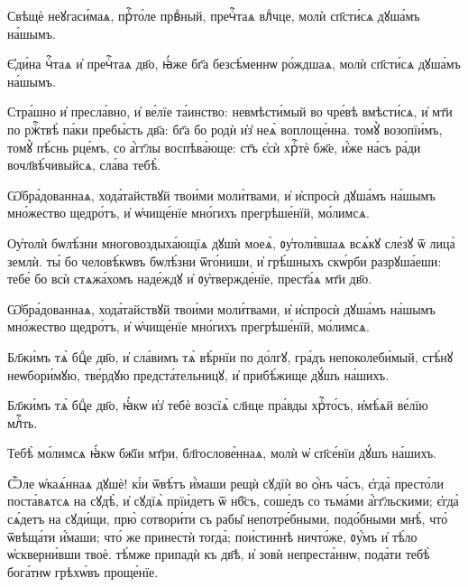 \hKv Свѣщѐ неꙋгаси́маѧ, прⷭ҇то́ле првⷣный, пречⷭ҇таѧ влⷣчце,  молѝ сп҃сти́сѧ дꙋша́мъ на́шымъ.  
%

\hKv Є҆ди́на чⷭ҇таѧ и҆ пречⷭ҇таѧ дв҃о, ꙗ҆́же бг҃а безсѣ́меннѡ  ро́ждшаѧ, молѝ сп҃сти́сѧ дꙋша́мъ на́шымъ.  
%

\hKv Стра́шно и҆ пресла́вно, и҆ ве́лїе та́инство: невмѣсти́мый  во чре́вѣ вмѣсти́сѧ, и҆ мт҃и по ржⷭ҇твѣ̀ па́ки пребы́сть  дв҃а: бг҃а бо родѝ и҆з̾ неѧ̀ воплоще́нна. томꙋ̀  возопїи́мъ, томꙋ̀ пѣ́снь рце́мъ, со а҆́гг҃лы воспѣва́юще:  ст҃ъ є҆сѝ хрⷭ҇тѐ бж҃е, и҆́же на́съ ра́ди  вочл҃вѣ́чивыйсѧ, сла́ва тебѣ̀. 
%

\hKv Ѡ҆бра́дованнаѧ, хода́тайствꙋй твои́ми моли́твами, и҆  и҆спросѝ дꙋша́мъ на́шымъ мно́жество щедро́тъ, и҆ ѡ҆чище́нїе  мно́гихъ прегрѣше́нїй, мо́лимсѧ.  
%

\hKv Оу҆толѝ бѡлѣ́зни многовоздыха́ющїѧ дꙋшѝ моеѧ̀,  ᲂу҆толи́вшаѧ всѧ́кꙋ сле́зꙋ ѿ лица̀ землѝ. ты́ бо  человѣ́кѡвъ бѡлѣ́зни ѿго́ниши, и҆ грѣ́шныхъ скѡ́рби  разрꙋша́еши:  тебе́ бо всѝ  стѧжа́хомъ наде́ждꙋ и҆ ᲂу҆твержде́нїе, прест҃а́ѧ мт҃и дв҃о. 
%

\hKv Ѡ҆бра́дованнаѧ, хода́тайствꙋй твои́ми моли́твами, и҆  и҆спросѝ дꙋша́мъ на́шымъ мно́жество щедро́тъ, и҆ ѡ҆чище́нїе  мно́гихъ прегрѣше́нїй, мо́лимсѧ. 
%

\hKv Бл҃жи́мъ тѧ̀ бцⷣе дв҃о, и҆ сла́вимъ тѧ̀ вѣ́рнїи по до́лгꙋ,  гра́дъ непоколеби́мый, стѣ́нꙋ неѡбори́мꙋю, тве́рдꙋю  предста́тельницꙋ, и҆ прибѣ́жище дꙋ́шъ на́шихъ. 
%

\hKv Бл҃жи́мъ тѧ̀ бцⷣе дв҃о, ꙗ҆́кѡ и҆з̾ тебѐ возсїѧ̀ сл҃нце  пра́вды хрⷭ҇то́съ, и҆мѣ́ѧй ве́лїю млⷭ҇ть. 
%

\hKv Тебѣ̀ мо́лимсѧ ꙗ҆́кѡ бж҃їи мт҃ри, бл҃гослове́ннаѧ, молѝ  ѡ҆ сп҃се́нїи дꙋ́шъ на́шихъ.  
%

\hKv Ѽле ѡ҆каѧ́ннаѧ дꙋшѐ! кі́и ѿвѣ́тъ и҆́маши рещѝ сꙋдїѝ  во ѻ҆́нъ ча́съ, є҆гда̀ престо́ли поста́вѧтсѧ на сꙋдѣ̀, и҆  сꙋдїѧ̀ прїи́детъ ѿ нб҃съ, соше́дъ со тьма́ми  а҆́гг҃льскими; є҆гда̀ сѧ́детъ на сꙋди́щи, прю̀ сотвори́ти  съ рабы̑ непотре́бными, подо́бными мнѣ̀, что̀ ѿвѣща́ти  и҆́маши; что́ же принестѝ тогда̀; пои́стиннѣ ничто́же,  ᲂу҆́мъ и҆ тѣ́ло ѡ҆скверни́вши твоѐ. тѣ́мже припадѝ къ  дв҃ѣ, и҆ зовѝ непреста́ннѡ, пода́ти тебѣ̀ бога́тнѡ  грѣхѡ́въ проще́нїе. 
%

